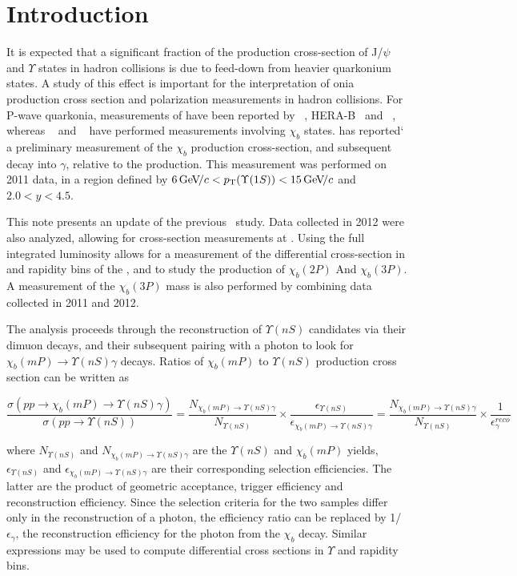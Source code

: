 
\section{Introduction}
\label{sec:Introduction}

It is expected that a significant fraction of the production cross-section of J/$\psi$ and $\Upsilon$ states in hadron collisions is due to feed-down from heavier 
quarkonium states. A study of this effect is important for the interpretation of onia production cross section and polarization measurements in hadron collisions.  
For P-wave quarkonia, measurements of \chic have been reported by \cdf~\cite{pub:cdf_chic}, HERA-B~\cite{pub:herab_chic} and \lhcb~\cite{pub:lhcb_chic}, 
whereas \cdf~\cite{pub:cdf_chib} and \atlas~\cite{pub:atlas_chib} have performed measurements involving $\chi_b$ states. 
\lhcb has reported`\cite{pub:lhcb_chib} a preliminary measurement of the $\chi_b$ production cross-section, and subsequent decay into \OneS $\gamma$, 
relative to the \OneS production. This measurement was performed on 2011 data, in a region defined by $6 \gevc < \pt(\OneS) < 15 \gevc$ and 
$2.0 < y < 4.5$.  

This note presents an update of the previous \lhcb\ study. Data collected in 2012 were also analyzed, allowing for cross-section measurements at 
\tev. Using the full integrated luminosity allows for a measurement of the differential cross-section in \pt and rapidity bins of the \OneS, and to study the 
production of $\chi_b(2P)$ And $\chi_b(3P)$. A measurement of the $\chi_b(3P)$ mass is also performed by combining data collected in 2011 and 2012. 

The analysis proceeds through the reconstruction of $\Upsilon(nS)$ candidates via their dimuon decays, and their subsequent pairing with a photon to  
look for $\chi_b(mP) \to \Upsilon(nS) \gamma$ decays. Ratios of $\chi_b(mP)$ to $\Upsilon(nS)$ production cross section can be written as

\begin{equation}
    \frac{\sigma(pp \to \chi_b(mP)  \to \Upsilon(nS) \gamma)}{\sigma(pp \to \Upsilon(nS))} = 
    \frac{N_{\chi_b(mP)\to \Upsilon(nS) \gamma}}{N_{\Upsilon(nS)}} \times \frac{\epsilon_{\Upsilon(nS)}}{\epsilon_{\chi_b(mP)\to \Upsilon(nS) \gamma}} = 
    \frac{N_{\chi_b(mP)\to \Upsilon(nS) \gamma}}{N_{\Upsilon(nS)}} \times \frac{1}{\epsilon^{reco}_{\gamma}}
\end{equation}

\noindent where ${N_{\Upsilon(nS)}}$ and ${N_{\chi_b(mP)\to \Upsilon(nS) \gamma}}$ are the $\Upsilon(nS)$ and $\chi_b(mP)$ yields,  
$\epsilon_{\Upsilon(nS)}$ and $\epsilon_{\chi_b(mP)\to \Upsilon(nS) \gamma}$ are their corresponding selection efficiencies. 
The latter are the product of geometric acceptance, trigger efficiency and reconstruction efficiency. Since the selection criteria for the two samples differ only 
in the reconstruction of a photon, the efficiency ratio can be replaced by 1/$\epsilon_{\gamma}$, the reconstruction efficiency for the photon from the $\chi_b$ 
decay. Similar expressions may be used to compute differential cross sections in $\Upsilon$ \pt and rapidity bins. 